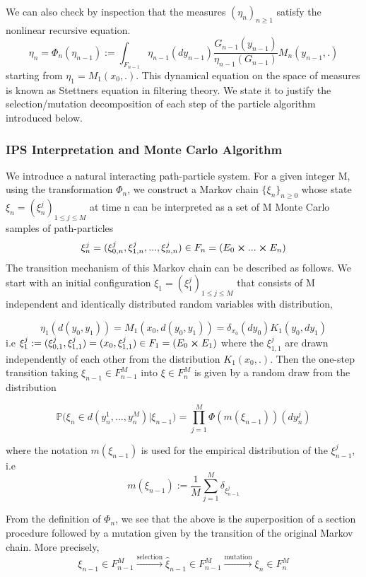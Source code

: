 We can also check by inspection that the measures $(\eta_n)_{n\geq 1}$ satisfy the nonlinear recursive equation.
$$\eta_n = \varPhi_n(\eta_{n-1}) := \int_{F_{n-1}} \eta_{n-1}(dy_{n-1}) \frac{G_{n-1}(y_{n-1})}{\eta_{n-1}(G_{n-1})} M_n(y_{n-1},.)$$
starting from $\eta_1 = M_1(x_0,.)$. This dynamical equation on the space of measures is known as Stettners equation in filtering theory. We state it to justify the selection/mutation decomposition of each step of the particle algorithm introduced below.


\subsubsection{IPS Interpretation and Monte Carlo Algorithm}
We introduce a natural interacting path-particle system. For a given integer M, using the transformation $\varPhi_n$, we construct a Markov chain $\{\xi_n\}_{n\geq 0}$ whose state $\xi_n = (\xi_n^j)_{1\leq j \leq M}$ at time n can be interpreted as a set of M Monte Carlo samples of path-particles 
$$\xi_n^j = (\xi_{0,n}^j, \xi_{1,n}^j,..., \xi_{n,n}^j) \in F_n = (E_0 \cross ... \cross E_n)$$
The transition mechanism of this Markov chain can be described as follows. We start with an initial configuration $\xi_1 = (\xi_1^j)_{1\leq j \leq M}$ that consists of M independent and identically distributed random variables with distribution,

$$\eta_1(d(y_0,y_1)) = M_1(x_0,d(y_0,y_1)) = \delta_{x_0}(dy_0)K_1(y_0, dy_1) $$
i.e $\xi_1^j := (\xi_{0,1}^j,\xi_{1,1}^j) = (x_0, \xi_{1,1}^j) \in F_1 = (E_0 \cross E_1)$ where the $\xi_{1,1}^j$ are drawn independently of each other from the distribution $K_1(x_0,.)$. Then the one-step transition taking $\xi_{n-1} \in F_{n-1}^M$ into $\xi \in F_n^M$ is given by a random draw from the distribution

\begin{equation}
\mathbb{P}\big( \xi_n \in d(y_n^1,...,y_n^M)|\xi_{n-1}  \big) = \prod_{j=1}^{M}\varPhi(m(\xi_{n-1}))(dy_n^j)
\end{equation}

where the notation $m(\xi_{n-1})$ is used for the empirical distribution of the $\xi_{n-1}^j$, i.e
$$m(\xi_{n-1}) := \frac{1}{M}\sum_{j=1}^{M}\delta_{\xi_{n-1}^{j}}$$

From the definition of $\varPhi_n$, we see that the above is the superposition of a section procedure followed by a mutation given by the transition of the original Markov chain. More precisely,
$$\xi_{n-1} \in F_{n-1}^{M}  \xrightarrow{\text{selection}} \hat{\xi}_{n-1} \in F_{n-1}^M \xrightarrow{\text{mutation}} \xi_n \in F_n^M$$

